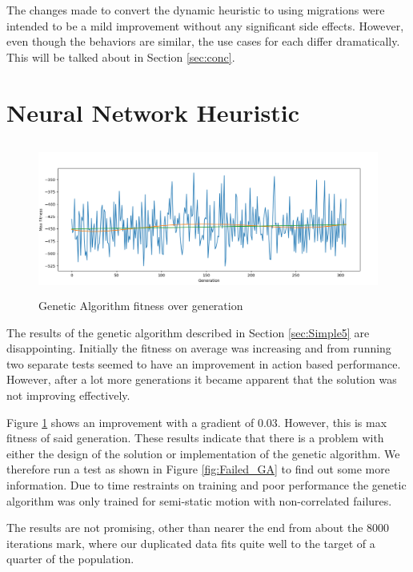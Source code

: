 \documentclass{UoYCSproject}
\begin{document}
The changes made to convert the dynamic heuristic to using migrations were intended to be a mild improvement without any significant side effects. 
However, even though the behaviors are similar, the use cases for each differ dramatically. 
This will be talked about in Section \ref{sec:conc}.

\section{Neural Network Heuristic}
\label{sec:Simple5a}

\begin{figure}[htb]
\label{fig:FitnessGA}
\begin{center}
\centering
\includegraphics[height=5cm]{"./GA_max_fitness_0.03_gradient.png"}
\caption{Genetic Algorithm fitness over generation}
\end{center}
\end{figure}

The results of the genetic algorithm described in Section \ref{sec:Simple5} are disappointing.
Initially the fitness on average was increasing and from running two separate tests seemed to have an improvement in action based performance.
However, after a lot more generations it became apparent that the solution was not improving effectively.

Figure \ref{fig:FitnessGA} shows an improvement with a gradient of 0.03.
However, this is max fitness of said generation.
These results indicate that there is a problem with either the design of the solution or implementation of the genetic algorithm.
We therefore run a test as shown in Figure \ref{fig:Failed_GA} to find out some more information.
Due to time restraints on training and poor performance the genetic algorithm was only trained for semi-static motion with non-correlated failures.

The results are not promising, other than nearer the end from about the 8000 iterations mark, where our duplicated data fits quite well to the target of a quarter of the population.
\end{document}

